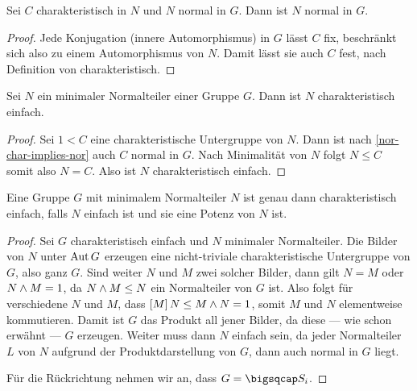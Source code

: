 \begin{lemma}\label{nor-char-implies-nor}
    Sei $C$ charakteristisch in $N$ und $N$ normal in $G$. Dann ist $N$ normal in $G$.
\end{lemma}

\begin{proof}
Jede Konjugation (innere Automorphismus) in $G$ lässt $C$ fix, beschränkt sich also zu einem Automorphismus von $N$. Damit lässt
sie auch $C$ fest, nach Definition von charakteristisch.    
\end{proof}

\begin{lemma}
    Sei $N$ ein minimaler Normalteiler einer Gruppe $G$. Dann ist $N$ charakteristisch einfach.
\end{lemma}

\begin{proof}
    Sei $1<C$ eine charakteristische Untergruppe von $N$. Dann ist nach \ref{nor-char-implies-nor} auch $C$ normal in $G$. Nach
    Minimalität von $N$ folgt $N\leq C$ somit also $N=C$. Also ist $N$ charakteristisch einfach.
\end{proof}

\begin{theorem}
    Eine Gruppe $G$ mit minimalem Normalteiler $N$ ist genau dann charakteristisch einfach, falls $N$ einfach ist und sie eine Potenz von $N$ ist.
\end{theorem}

\begin{proof}
    Sei $G$ charakteristisch einfach und $N$ minimaler Normalteiler. Die Bilder von $N$ unter $\mathop{\mathrm{Aut}}\nolimits G$ erzeugen eine nicht-triviale
    charakteristische Untergruppe von $G$, also ganz $G$. Sind weiter $N$ und $M$ zwei solcher Bilder, dann gilt $N = M$ oder
    $N\wedge M = 1$, da $N\wedge M\leq N$ ein Normalteiler von $G$ ist. Also folgt für verschiedene $N$ und $M$, dass
    $\left[M\right] N \leq M\wedge N = 1$, somit $M$ und $N$ elementweise kommutieren. Damit ist $G$ das Produkt all
    jener Bilder, da diese --- wie schon erwähnt --- $G$ erzeugen. Weiter muss dann $N$ einfach sein, da jeder Normalteiler $L$ von
    $N$ aufgrund der Produktdarstellung von $G$, dann auch normal in $G$ liegt.

    Für die Rückrichtung nehmen wir an, dass $G = \product S_i$.
\end{proof}



